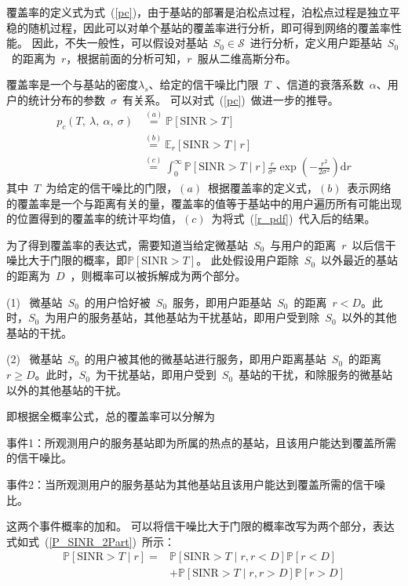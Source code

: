 
覆盖率的定义式为式~(\ref{pc})，由于基站的部署是泊松点过程，泊松点过程是独立平稳的随机过程，因此可以对单个基站的覆盖率进行分析，即可得到网络的覆盖率性能。
因此，不失一般性，可以假设对基站~$S_0\in\mathcal{S}$~进行分析，定义用户距基站~$S_0$~的距离为~$r$，根据前面的分析可知，$r$~服从二维高斯分布。

覆盖率是一个与基站的密度$\lambda_s$、给定的信干噪比门限~$T$~、信道的衰落系数~$\alpha$、用户的统计分布的参数~$\sigma$~有关系。
可以对式~(\ref{pc})~做进一步的推导。
\begin{equation}\label{pc_expand}
  \begin{aligned}
    p_c(T,~\lambda,~\alpha,~\sigma) &\overset{(a)}{=} \mathbb{P}[\mathrm{SINR}>T] \\
           &\overset{(b)}{=} \mathbb{E}_r[\mathrm{SINR}>T\mid r] \\
           &\overset{(c)}{=} \int_0^\infty \mathbb{P}[\mathrm{SINR}>T\mid r] \frac{r}{\sigma^2}\exp(-\frac{r^2}{2\sigma^2}) \mathrm{d} r
  \end{aligned}
\end{equation}
其中~$T$~为给定的信干噪比的门限，$(a)$~根据覆盖率的定义式，$(b)$~表示网络的覆盖率是一个与距离有关的量，覆盖率的值等于基站中的用户遍历所有可能出现的位置得到的覆盖率的统计平均值，$(c)$~为将式~(\ref{r_pdf})~代入后的结果。

为了得到覆盖率的表达式，需要知道当给定微基站~$S_0$~与用户的距离~$r$~以后信干噪比大于门限的概率，即$\mathbb{P}[\mathrm{SINR}>T]$。
此处假设用户距除~$S_0$~以外最近的基站的距离为~$D$~，则概率可以被拆解成为两个部分。

(1)~ 微基站~$S_0$~的用户恰好被~$S_0$~服务，即用户距基站~$S_0$~的距离~$r < D$。此时，$S_0$~为用户的服务基站，其他基站为干扰基站，即用户受到除~$S_0$~以外的其他基站的干扰。

(2)~ 微基站~$S_0$~的用户被其他的微基站进行服务，即用户距离基站~$S_0$~的距离~$r \geq D$。此时，$S_0$~为干扰基站，即用户受到~$S_0$~基站的干扰，和除服务的微基站以外的其他基站的干扰。

即根据全概率公式，总的覆盖率可以分解为

事件1：所观测用户的服务基站即为所属的热点的基站，且该用户能达到覆盖所需的信干噪比。

事件2：当所观测用户的服务基站为其他基站且该用户能达到覆盖所需的信干噪比。

这两个事件概率的加和。
可以将信干噪比大于门限的概率改写为两个部分，表达式如式~(\ref{P_SINR_2Part})~所示：
\begin{equation}\label{P_SINR_2Part}
  \begin{aligned}
  \mathbb{P}[\mathrm{SINR}>T \mid r] =& \mathbb{P}[\mathrm{SINR}>T \mid r, r < D] \mathbb{P}[r<D]\\
                               &+ \mathbb{P}[\mathrm{SINR}>T \mid r, r > D]\mathbb{P}[r>D]
  \end{aligned}
\end{equation}

